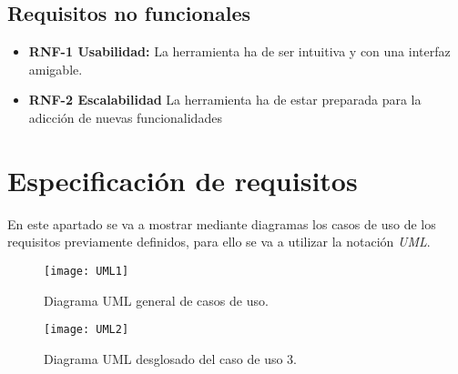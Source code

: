 \subsection{Requisitos no funcionales}
\begin{itemize}
	\item \textbf{RNF-1 Usabilidad:} La herramienta ha de ser intuitiva y con una interfaz amigable.
	\item  \textbf{RNF-2 Escalabilidad} La herramienta ha de estar preparada para la adicción de nuevas funcionalidades
\end{itemize}
\section{Especificación de requisitos}
En este apartado se va a mostrar mediante diagramas los casos de uso de los requisitos previamente definidos, para ello se va a utilizar la notación \emph{UML}\cite{uml}.

\begin{figure}[H]
	\centering
	\texttt{[image: UML1]}
	\caption{Diagrama UML general de casos de uso.}
\end{figure}

\begin{figure}[H]
	\centering
	\texttt{[image: UML2]}
	\caption{Diagrama UML desglosado del caso de uso 3.}
\end{figure}

